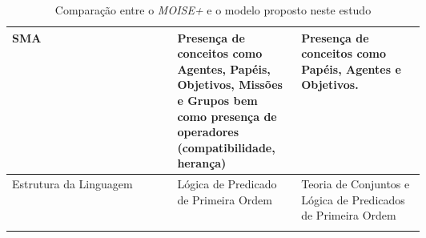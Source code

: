 \begin{center}
\begin{longtable}[H]{|l|p{0.3\linewidth}|p{0.3\linewidth}|}
\\ \hline
SMA        		
& 
Presença de conceitos como Agentes, Papéis, Objetivos, Missões e Grupos bem como presença de  operadores (compatibilidade, herança)  
& 
Presença de conceitos como Papéis, Agentes e Objetivos. 

\\ \hline
Estrutura da Linguagem
& 
Lógica de Predicado de Primeira Ordem 
&
Teoria de Conjuntos e Lógica de Predicados de Primeira Ordem

\\ \hline
\caption{Comparação entre o \textit{MOISE+} e o modelo proposto neste estudo}
\label{genmoise1}
\end{longtable}
\end{center}